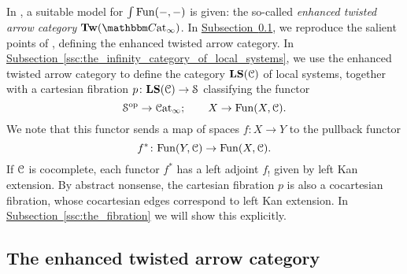 \documentclass[main.tex]{subfiles}
\begin{document}
In \cite{garcia2020enhanced}, a suitable model for $\int\mathrm{Fun}(-, -)$ is given: the so-called \emph{enhanced twisted arrow category} $\Tw(\ICCat)$. In \hyperref[ssc:the_twisted_arrow_category]{Subsection~\ref*{ssc:the_twisted_arrow_category}}, we reproduce the salient points of \cite{garcia2020enhanced}, defining the enhanced twisted arrow category. In \hyperref[ssc:the_infinity_category_of_local_systems]{Subsection~\ref*{ssc:the_infinity_category_of_local_systems}}, we use the enhanced twisted arrow category to define the category $\mathbf{LS}(\mathcal{C})$ of local systems, together with a cartesian fibration $p\colon \mathbf{LS}(\mathcal{C}) \to \mathcal{S}$ classifying the functor
\begin{equation*}
  \mathcal{S}^{\mathrm{op}} \to \mathcal{C}\mathrm{at}_{\infty};\qquad X \to \mathrm{Fun}(X, \mathcal{C}).
\end{equation*}
We note that this functor sends a map of spaces $f\colon X \to Y$ to the pullback functor
\begin{equation*}
  f^{*}\colon \mathrm{Fun}(Y, \mathcal{C}) \to \mathrm{Fun}(X, \mathcal{C}).
\end{equation*}
If $\mathcal{C}$ is cocomplete, each functor $f^{*}$ has a left adjoint $f_{!}$ given by left Kan extension. By abstract nonsense, the cartesian fibration $p$ is also a cocartesian fibration, whose cocartesian edges correspond to left Kan extension. In \hyperref[ssc:the_fibration]{Subsection~\ref*{ssc:the_fibration}} we will show this explicitly.

\subsection{The enhanced twisted arrow category}
\label{ssc:the_twisted_arrow_category}
\end{document}
